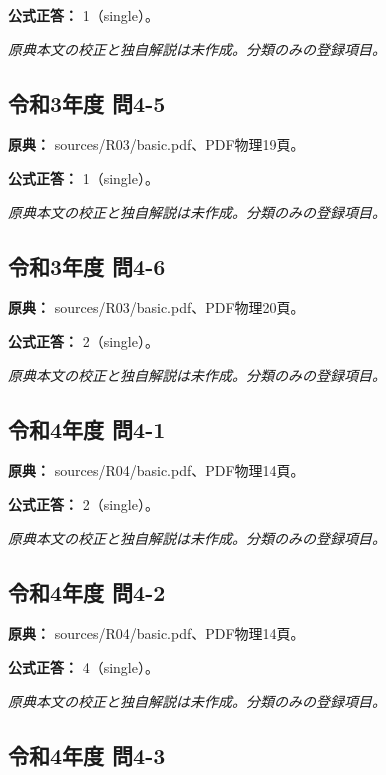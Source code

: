 \textbf{公式正答：} 1（single）。

\par\textit{原典本文の校正と独自解説は未作成。分類のみの登録項目。}

\subsection{令和3年度 問4-5}
\label{q:r03-reg-basic-4-5}

\noindent\textbf{原典：} sources/R03/basic.pdf、PDF物理19頁。

\textbf{公式正答：} 1（single）。

\par\textit{原典本文の校正と独自解説は未作成。分類のみの登録項目。}

\subsection{令和3年度 問4-6}
\label{q:r03-reg-basic-4-6}

\noindent\textbf{原典：} sources/R03/basic.pdf、PDF物理20頁。

\textbf{公式正答：} 2（single）。

\par\textit{原典本文の校正と独自解説は未作成。分類のみの登録項目。}

\subsection{令和4年度 問4-1}
\label{q:r04-reg-basic-4-1}

\noindent\textbf{原典：} sources/R04/basic.pdf、PDF物理14頁。

\textbf{公式正答：} 2（single）。

\par\textit{原典本文の校正と独自解説は未作成。分類のみの登録項目。}

\subsection{令和4年度 問4-2}
\label{q:r04-reg-basic-4-2}

\noindent\textbf{原典：} sources/R04/basic.pdf、PDF物理14頁。

\textbf{公式正答：} 4（single）。

\par\textit{原典本文の校正と独自解説は未作成。分類のみの登録項目。}

\subsection{令和4年度 問4-3}
\label{q:r04-reg-basic-4-3}

